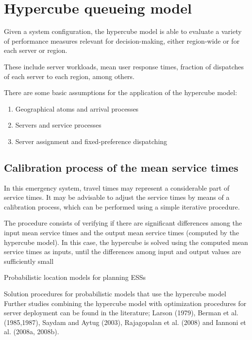 

\section{Hypercube queueing model}
\begin{frame}
Given a system configuration, 
the hypercube model is able to evaluate a variety of performance
measures relevant for decision-making, 
either region-wide or for each server or region.

These include 
server workloads, 
mean user response times, 
fraction of dispatches of each server to each region,
among others.
\end{frame}

\begin{frame}
There are some basic assumptions for the application of the hypercube model:
\begin{enumerate}
\item Geographical atoms and arrival processes
\item Servers and service processes
\item Server assignment and fixed-preference dispatching
\end{enumerate}
\end{frame}

\subsection{Calibration process of the mean service times}
\begin{frame}
In this emergency system, 
travel times may represent a considerable part of service times. 
It may be advisable to adjust the service times by means of a calibration process,
which can be performed using a simple iterative procedure.

The procedure consists of 
verifying if there are significant differences among 
the input mean service times and the output mean service times (computed by the hypercube model). 
In this case, 
the hypercube is solved using the computed mean service times as inputs, 
until the differences among input and output values are sufficiently small
\end{frame}

\begin{frame}{Probabilistic location models for planning ESSs}

Solution procedures for probabilistic models that use the hypercube model
Further studies combining the hypercube model with optimization procedures for server
deployment can be found in the literature; 
Larson (1979), 
Berman et al. (1985,1987), 
Saydam and Aytug (2003), 
Rajagopalan et al. (2008) and 
Iannoni et al. (2008a, 2008b).
\end{frame}
